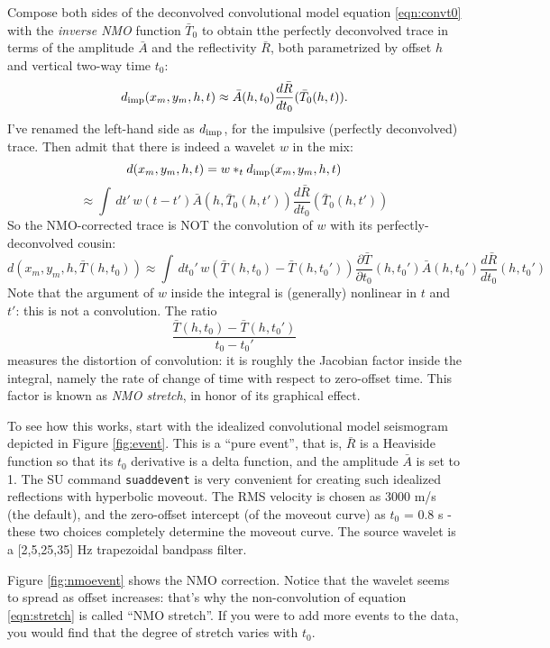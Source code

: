 Compose both sides of the deconvolved convolutional model equation \ref{eqn:convt0} with the {\em inverse NMO} function $\bar{T}_0$ to obtain tthe perfectly deconvolved trace in terms of the amplitude $\bar{A}$ and the reflectivity $\bar{R}$, both parametrized by offset $h$ and vertical two-way time $t_0$:
\begin{equation}
\label{eqn:convt}
d_{\rm imp}(x_m,y_m,h,t) \approx \bar{A}(h,t_0) \frac{d\bar{R}}{dt_0}(\bar{T}_0(h,t)).
\end{equation}
I've renamed the left-hand side as $d_{\rm imp}$, for the impulsive (perfectly deconvolved) trace. Then admit that there is indeed a wavelet $w$ in the mix:
\[
d(x_m,y_m,h,t) = w *_t d_{\rm imp}(x_m,y_m,h,t)
\]
\[
\approx \int\,dt'\,w(t-t') \bar{A}(h,\bar{T}_0(h,t')) \frac{d\bar{R}}{dt_0}(\bar{T}_0(h,t'))
\]
So the NMO-corrected trace is NOT the convolution of $w$ with its perfectly-deconvolved cousin:
\begin{equation}
\label{eqn:stretch}
d(x_m,y_m,h,\bar{T}(h,t_0)) \approx \int\,dt_0'\,w(\bar{T}(h,t_0)-\bar{T}(h,t_0')) \frac{\partial \bar{T}}{\partial t_0}(h,t_0')\bar{A}(h,t_0') \frac{d\bar{R}}{dt_0}(h,t_0')
\end{equation}
Note that the argument of $w$ inside the integral is (generally) nonlinear in $t$ and $t'$: this is not a convolution. The ratio
\[
\frac{\bar{T}(h,t_0)-\bar{T}(h,t_0')}{t_0-t_0'}
\]
measures the distortion of convolution: it is roughly the Jacobian factor inside the integral, namely the rate of change of time with respect to zero-offset time. This factor is known as {\em NMO stretch}, in honor of its graphical effect.

To see how this works, start with the idealized convolutional model seismogram depicted in Figure \ref{fig:event}. This is a ``pure event'', that is, $\bar{R}$ is a Heaviside function so that its $t_0$ derivative is a delta function, and the amplitude $\bar{A}$ is set to 1. The SU command {\tt suaddevent} is very convenient for creating such idealized reflections with hyperbolic moveout. The RMS velocity is chosen as 3000 m/s (the default), and the zero-offset intercept (of the moveout curve) as $t_0$ = 0.8 s - these two choices completely determine the moveout curve.  The source wavelet is a [2,5,25,35] Hz trapezoidal bandpass filter. 

Figure \ref{fig:nmoevent} shows the NMO correction. Notice that the wavelet seems to spread as offset increases: that's why the non-convolution of equation \ref{eqn:stretch} is called ``NMO stretch''.  If you were to add more events to the data, you would find that the degree of stretch varies with $t_0$.

